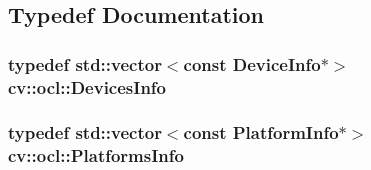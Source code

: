\subsection{Typedef Documentation}
\hypertarget{namespacecv_1_1ocl_a0ce4074167f6aee3ebee6861ad51cffd}{
\subsubsection[{Devices\-Info}]{\setlength{\rightskip}{0pt plus 5cm}typedef std\-::vector$<$const {\bf Device\-Info}$\ast$$>$ {\bf cv\-::ocl\-::\-Devices\-Info}}}\label{namespacecv_1_1ocl_a0ce4074167f6aee3ebee6861ad51cffd}
\hypertarget{namespacecv_1_1ocl_a023858a053cfb1cbf0545e54dcc8c798}{
\subsubsection[{Platforms\-Info}]{\setlength{\rightskip}{0pt plus 5cm}typedef std\-::vector$<$const {\bf Platform\-Info}$\ast$$>$ {\bf cv\-::ocl\-::\-Platforms\-Info}}}\label{namespacecv_1_1ocl_a023858a053cfb1cbf0545e54dcc8c798}


